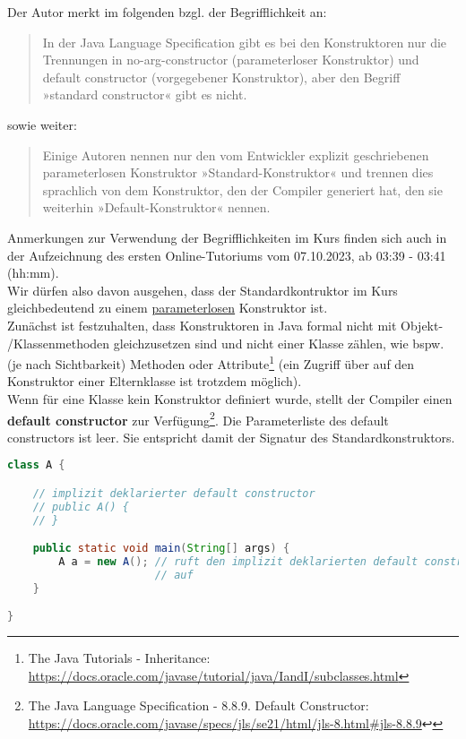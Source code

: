 Der Autor merkt im folgenden bzgl. der Begrifflichkeit an:

\blockquote[{\cite[516]{Ull12}}]{
    In der Java Language Specification gibt es bei den Konstruktoren nur die Trennungen in no-arg-constructor
    (parameterloser Konstruktor) und default constructor (vorgegebener Konstruktor), aber den Begriff
    »standard constructor« gibt es nicht.
}

sowie weiter:

\blockquote[{\cite[517]{Ull12}}]{
    Einige Autoren nennen nur den vom Entwickler explizit geschriebenen parameterlosen Konstruktor »Standard-Konstruktor«
    und trennen dies sprachlich von dem Konstruktor, den der Compiler generiert hat, den sie weiterhin »Default-Konstruktor« nennen.
}

Anmerkungen zur Verwendung der Begrifflichkeiten im Kurs finden sich auch in der Aufzeichnung des ersten Online-Tutoriums
vom 07.10.2023, ab 03:39 - 03:41 (hh:mm).\\

Wir dürfen also davon ausgehen, dass der Standardkontruktor im Kurs gleichbedeutend zu einem \underline{parameterlosen}
Konstruktor ist.\\

Zunächst ist festzuhalten, dass Konstruktoren in Java formal nicht mit Objekt- /Klassenmethoden gleichzusetzen sind
und nicht  einer Klasse zählen, wie bspw. (je nach Sichtbarkeit) Methoden oder Attribute\footnote{
    The Java Tutorials - Inheritance: \url{https://docs.oracle.com/javase/tutorial/java/IandI/subclasses.html}
} (ein Zugriff über  auf den Konstruktor einer Elternklasse ist trotzdem möglich).\\

Wenn für eine Klasse kein Konstruktor definiert wurde, stellt der Compiler einen \textbf{default constructor}
zur Verfügung\footnote{
    The Java Language Specification - 8.8.9. Default Constructor: \url{https://docs.oracle.com/javase/specs/jls/se21/html/jls-8.html#jls-8.8.9}↩
}.
Die Parameterliste des default constructors ist leer.
Sie entspricht damit der Signatur des Standardkonstruktors.

\begin{lstlisting}[language=java]
class A {

    // implizit deklarierter default constructor
    // public A() {
    // }

    public static void main(String[] args) {
        A a = new A(); // ruft den implizit deklarierten default constructor
                       // auf
    }

}
\end{lstlisting}

